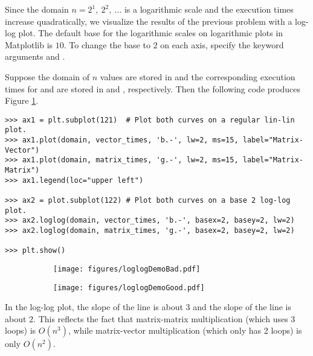 Since the domain $n = 2^1,\ 2^2,\ \ldots$ is a logarithmic scale and the execution times increase quadratically, we visualize the results of the previous problem with a log-log plot.
The default base for the logarithmic scales on logarithmic plots in Matplotlib is $10$.
To change the base to $2$ on each axis, specify the keyword arguments  and .

Suppose the domain of $n$ values are stored in  and the corresponding execution times for  and  are stored in  and , respectively.
Then the following code produces Figure \ref{fig:loglogdemo}.

\begin{lstlisting}
>>> ax1 = plt.subplot(121)  # Plot both curves on a regular lin-lin plot.
>>> ax1.plot(domain, vector_times, 'b.-', lw=2, ms=15, label="Matrix-Vector")
>>> ax1.plot(domain, matrix_times, 'g.-', lw=2, ms=15, label="Matrix-Matrix")
>>> ax1.legend(loc="upper left")

>>> ax2 = plot.subplot(122) # Plot both curves on a base 2 log-log plot.
>>> ax2.loglog(domain, vector_times, 'b.-', basex=2, basey=2, lw=2)
>>> ax2.loglog(domain, matrix_times, 'g.-', basex=2, basey=2, lw=2)

>>> plt.show()
\end{lstlisting}

\begin{figure}[H] %
\captionsetup[subfigure]{justification=centering}
\centering
\begin{subfigure}{.5\textwidth}
    \centering
    \texttt{[image: figures/loglogDemoBad.pdf]}
\end{subfigure}%
\begin{subfigure}{.5\textwidth}
    \centering
    \texttt{[image: figures/loglogDemoGood.pdf]}
\end{subfigure}
\caption{ }
\label{fig:loglogdemo}
\end{figure}

In the log-log plot, the slope of the  line is about $3$ and the slope of the  line is about $2$.
This reflects the fact that matrix-matrix multiplication (which uses 3 loops) is $O(n^3)$, while matrix-vector multiplication (which only has 2 loops) is only $O(n^2)$.

